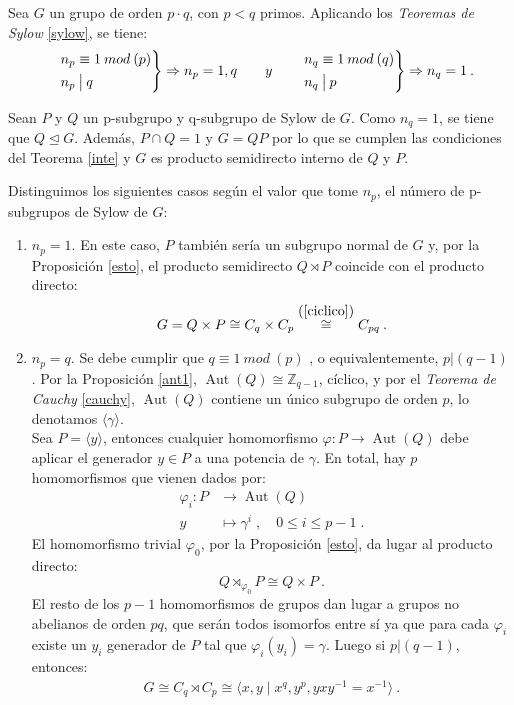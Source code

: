 Sea $G$ un grupo de orden $p\cdot q$, con $p<q$ primos. Aplicando los \textit{Teoremas de Sylow} \ref{sylow}, se tiene:
\begin{equation*}
\begin{rcases}
  &n_p  \equiv 1\: mod \:( p )\\
  &n_p  \: \big | \: q
\end{rcases}
\Rightarrow  n_p= 1,q \quad \quad y \quad 
\begin{rcases}
  &n_q  \equiv  1\: mod\:( q ) \\
  &n_q  \: \big | \: p 
\end{rcases}
\Rightarrow  n_q = 1  \:.
\end{equation*}

\hfill 

Sean $P$ y $Q$ un p-subgrupo y q-subgrupo de Sylow de $G$. Como $n_q = 1$, se tiene que $Q \trianglelefteq G$. Además, $P \cap Q = 1$ y $G=QP$ por lo que se cumplen las condiciones del Teorema \ref{inte} y $G$ es producto semidirecto interno de $Q$ y $P$.


Distinguimos los siguientes casos según el valor que tome $n_p$, el número de p-subgrupos de Sylow de $G$:
\begin{enumerate}
    \item $n_p=1$. En este caso, $P$ también sería un subgrupo normal de $G$ y, por la Proposición \ref{esto}, el producto semidirecto $Q \rtimes P$ coincide con el producto directo:
    \[
    G = Q \times P \cong C_q \times C_p    \stackrel{\hbox{(\ref{ciclico})}}{\hbox{$\cong$}} C_{pq} \: .
    \]

    \item $n_p=q$. Se debe cumplir que $q \equiv 1 \: mod \:(p)$ , o equivalentemente, $p \big | (q-1)$. Por la Proposición \ref{ant1}, $\operatorname{Aut}(Q) \cong \mathbb{Z}_{q-1}$, cíclico, y por el \textit{Teorema de Cauchy} \ref{cauchy}, $\operatorname{Aut}(Q)$ contiene un único subgrupo de orden $p$, lo denotamos $\langle \gamma \rangle$.\\
    Sea $P= \langle y \rangle$, entonces cualquier homomorfismo $\varphi \colon P \rightarrow \operatorname{Aut}(Q)$ debe aplicar el generador $y\in P$ a una potencia de $\gamma$. En total, hay $p$ homomorfismos que vienen dados por:
    \begin{align*}
        \varphi_i \colon P &\rightarrow \operatorname{Aut}(Q) \\
        y& \mapsto \gamma^i \; , \quad 0 \leq i \leq p-1 \;. 
    \end{align*}
    El homomorfismo trivial $\varphi_0$, por la Proposición \ref{esto}, da lugar al producto directo:
    \[
    Q \rtimes_{\varphi_0} P \cong Q \times P \: .
    \]
    El resto de los $p-1$ homomorfismos de grupos dan lugar a grupos no abelianos de orden $pq$,  que serán todos isomorfos entre sí ya que para cada $\varphi_i$ existe un $y_i$ generador de $P$ tal que $\varphi_i(y_i) = \gamma$. Luego si $p |(q-1)$, entonces:
    \begin{align} \label{need}
       G \cong C_q \rtimes C_p  \cong \langle x,y \mid x^q, y^p, yxy^{-1}=x^{-1}  \rangle \: . 
    \end{align}
\end{enumerate}

